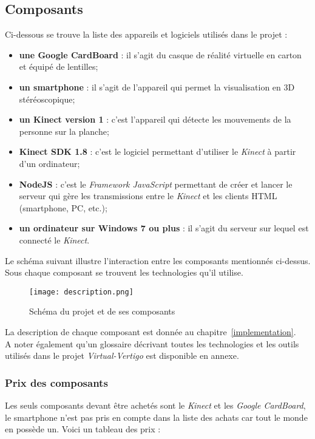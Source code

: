 \subsection*{Composants} \label{composants}
Ci-dessous se trouve la liste des appareils et logiciels utilisés dans le projet : 

\begin{itemize}
\item \textbf{une Google CardBoard} : il s'agit du casque de réalité virtuelle en carton et équipé de lentilles;
\item \textbf{un smartphone} : il s'agit de l'appareil qui permet la visualisation en 3D stéréoscopique;
\item \textbf{un Kinect version 1} : c'est l'appareil qui détecte les mouvements de la personne sur la planche; 
\item \textbf{Kinect SDK 1.8} : c'est le logiciel permettant d'utiliser le \textit{Kinect} à partir d'un ordinateur;
\item \textbf{NodeJS} : c'est le \textit{Framework JavaScript} permettant de créer et lancer le serveur qui gère les transmissions entre le \textit{Kinect} et les clients HTML (\textsf{smartphone}, PC, etc.);
\item \textbf{un ordinateur sur Windows 7 ou plus} : il s'agit du serveur sur lequel est connecté le \textit{Kinect}. \\

\end{itemize}

Le schéma suivant illustre l'interaction entre les composants mentionnés ci-dessus. Sous chaque composant se trouvent les technologies qu'il utilise.\\

\begin{figure}[H]
	\centering
   		\texttt{[image: description.png]}
   \caption{\label{Schéma} Schéma du projet et de ses composants}
\end{figure}

La description de chaque composant est donnée au chapitre~\ref{implementation}. \\
A noter également qu'un glossaire décrivant toutes les technologies et les outils utilisés dans le projet \textit{Virtual-Vertigo} est disponible en annexe.

\subsubsection{Prix des composants}
Les seuls composants devant être achetés sont le \textit{Kinect} et les \textit{Google CardBoard}, le \textsf{smartphone} n'est pas pris en compte dans la liste des achats car tout le monde en possède un. Voici un tableau des prix :

